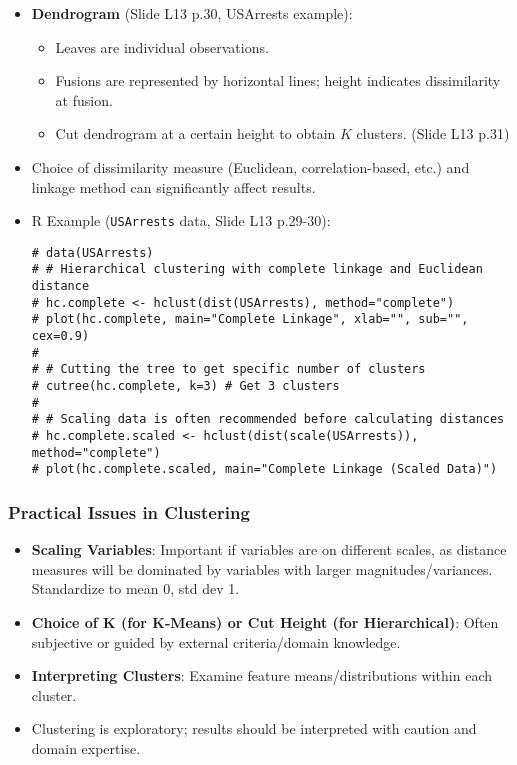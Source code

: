 \documentclass[12pt,a4paper]{article}
\newcommand{\Robject}[1]{\texttt{#1}} %
\begin{document}
\begin{itemize}
\begin{itemize}
                \end{itemize}
            \item \textbf{Dendrogram} (Slide L13 p.30, USArrests example):
                \begin{itemize}
                    \item Leaves are individual observations.
                    \item Fusions are represented by horizontal lines; height indicates dissimilarity at fusion.
                    \item Cut dendrogram at a certain height to obtain $K$ clusters. (Slide L13 p.31)
                \end{itemize}
            \item Choice of dissimilarity measure (Euclidean, correlation-based, etc.) and linkage method can significantly affect results.
            \item R Example (\Robject{USArrests} data, Slide L13 p.29-30):
\begin{lstlisting}[caption={Hierarchical Clustering in R (Slides L13 p.30)}]
# data(USArrests)
# # Hierarchical clustering with complete linkage and Euclidean distance
# hc.complete <- hclust(dist(USArrests), method="complete")
# plot(hc.complete, main="Complete Linkage", xlab="", sub="", cex=0.9)
# 
# # Cutting the tree to get specific number of clusters
# cutree(hc.complete, k=3) # Get 3 clusters
# 
# # Scaling data is often recommended before calculating distances
# hc.complete.scaled <- hclust(dist(scale(USArrests)), method="complete")
# plot(hc.complete.scaled, main="Complete Linkage (Scaled Data)")
\end{lstlisting}
        \end{itemize}
    \subsubsection{Practical Issues in Clustering }
        \begin{itemize}
            \item \textbf{Scaling Variables}: Important if variables are on different scales, as distance measures will be dominated by variables with larger magnitudes/variances. Standardize to mean 0, std dev 1.
            \item \textbf{Choice of K (for K-Means) or Cut Height (for Hierarchical)}: Often subjective or guided by external criteria/domain knowledge.
            \item \textbf{Interpreting Clusters}: Examine feature means/distributions within each cluster.
            \item Clustering is exploratory; results should be interpreted with caution and domain expertise.
        \end{itemize}
\end{document}
